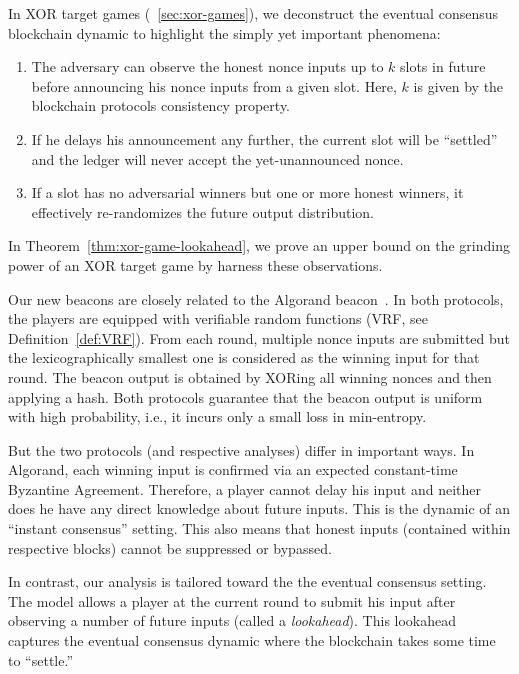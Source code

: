     In XOR target games (\Section~\ref{sec:xor-games}), 
    we deconstruct the eventual consensus blockchain dynamic 
    to highlight the simply yet important phenomena: 
    \begin{enumerate}
        \item The adversary can observe the honest nonce inputs up to $k$ slots in future 
        before announcing his nonce inputs from a given slot.
        Here, $k$ is given by the blockchain protocols consistency property.

        \item If he delays his announcement any further, the current slot will be ``settled'' 
        and the ledger will never accept the yet-unannounced nonce.

        \item If a slot has no adversarial winners but one or more honest winners, 
        it effectively re-randomizes the future output distribution.
    \end{enumerate}
    In Theorem~\ref{thm:xor-game-lookahead}, 
    we prove an upper bound on the grinding power of an XOR target game 
    by harness these observations.



        Our new beacons are closely related to the Algorand beacon~\cite{Algorand}. 
        In both protocols, 
        the players are equipped with verifiable
        random functions (VRF, see Definition~\ref{def:VRF}). 
        From each round, multiple nonce inputs are submitted 
        but the lexicographically smallest one is considered as the winning input for that round.
        The beacon output is obtained by XORing all winning nonces and then applying a hash. 
        Both protocols guarantee that the beacon output 
        is uniform with high probability, i.e., 
        it incurs only a small loss in min-entropy. 

        But the two protocols (and respective analyses) differ in important ways. 
        In Algorand, each winning input is confirmed via 
        an expected constant-time Byzantine Agreement. 
        Therefore, 
        a player cannot delay his input and neither does he have any direct knowledge 
        about future inputs. 
        This is the dynamic of an ``instant consensus'' setting. 
        This also means that honest inputs (contained within respective blocks) 
        cannot be suppressed or bypassed.

        In contrast, our analysis is tailored toward the the eventual consensus setting.
        The model allows a player at the current round to 
        submit his input after observing a number of future inputs 
        (called a \emph{lookahead}). 
        This lookahead captures the eventual consensus dynamic 
        where the blockchain takes some time to ``settle.'' 




